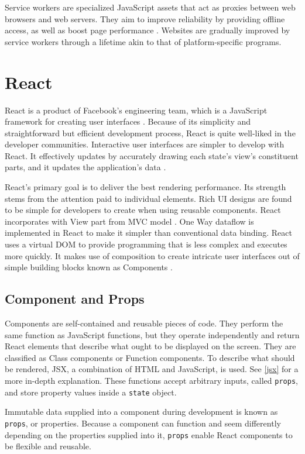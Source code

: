Service workers are specialized JavaScript assets that act as proxies between web browsers and web servers. They aim to improve reliability by providing offline access, as well as boost page performance \autocite{chrome2021service}. Websites are gradually improved by service workers through a lifetime akin to that of platform-specific programs.


\section{React}
\label{react}
React is a product of Facebook's engineering team, which is a JavaScript framework for creating user interfaces \autocite{gackenheimer2015introducing}. Because of its simplicity and straightforward but efficient development process, React is quite well-liked in the developer communities. Interactive user interfaces are simpler to develop with React. It effectively updates by accurately drawing each state's view's constituent parts, and it updates the application's data \autocite{islam2017reactjs}.

React's primary goal is to deliver the best rendering performance. Its strength stems from the attention paid to individual elements. Rich UI designs are found to be simple for developers to create when using reusable components. React incorporates with View part from MVC model \autocite{maratkar2021re}. One Way dataflow is implemented in React to make it simpler than conventional data binding. React uses a virtual DOM to provide programming that is less complex and executes more quickly. It makes use of composition to create intricate user interfaces out of simple building blocks known as Components \autocite{david2020building}.

\subsection{Component and Props}
Components are self-contained and reusable pieces of code. They perform the same function as JavaScript functions, but they operate independently and return React elements that describe what ought to be displayed on the screen. They are classified as Class components or Function components. To describe what should be rendered, JSX, a combination of HTML and JavaScript, is used. See \autoref{jsx} for a more in-depth explanation. These functions accept arbitrary inputs, called \texttt{props}, and store property values inside a \texttt{state} object.

Immutable data supplied into a component during development is known as \texttt{props}, or properties. Because a component can function and seem differently depending on the properties supplied into it, \texttt{props} enable React components to be flexible and reusable.

